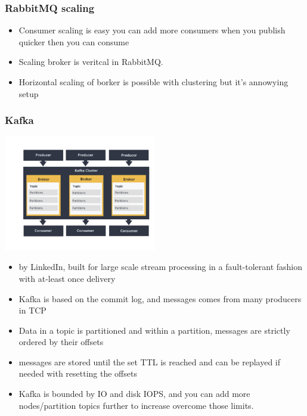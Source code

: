 \documentclass[12pt]{beamer}
\begin{document}
        \begin{frame}
            \begin{center}
                \frametitle{RabbitMQ scaling}
                \begin{itemize}
                    \item Consumer scaling is easy you can add more consumers when you publish quicker then you can consume
                    \pause
                    \item Scaling broker is veritcal in RabbitMQ.
                    \pause
                    \item Horizontal scaling of borker is possible with clustering but it's annowying setup
                \end{itemize}
            \end{center}
        \end{frame}

        \begin{frame}
            \begin{center}
                \frametitle{Kafka}
                \includegraphics[width=0.5\textwidth]{images/kafka}
                \begin{itemize}
                    \item by LinkedIn, built for large scale stream processing in a fault-tolerant fashion with at-least once delivery
                    \pause
                    \item Kafka is based on the commit log, and messages comes from many producers in TCP
                    \pause
                    \item Data in a topic is partitioned and within a partition, messages are strictly ordered by their offsets
                    \pause
                    \item messages are stored until the set TTL is reached and can be replayed if needed with resetting the offsets
                    \pause
                    \item Kafka is bounded by IO and disk IOPS, and you can add more nodes/partition topics further to increase overcome those limits.
                \end{itemize}
            \end{center}
        \end{frame}
\end{document}

